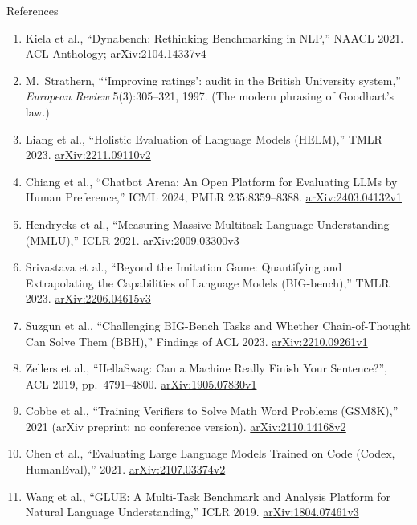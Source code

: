 \begin{frame}[allowframebreaks]{References}
  \footnotesize
  \begin{enumerate}
    \item Kiela et al., ``Dynabench: Rethinking Benchmarking in NLP,'' NAACL 2021. \href{https://aclanthology.org/2021.naacl-main.324/}{ACL Anthology}; \href{https://arxiv.org/abs/2104.14337v4}{arXiv:2104.14337v4}
    \item M.~Strathern, ```Improving ratings': audit in the British University system,'' \textit{European Review} 5(3):305--321, 1997. (The modern phrasing of Goodhart's law.)
    \item Liang et al., ``Holistic Evaluation of Language Models (HELM),'' TMLR 2023. \href{https://arxiv.org/abs/2211.09110v2}{arXiv:2211.09110v2}
    \item Chiang et al., ``Chatbot Arena: An Open Platform for Evaluating LLMs by Human Preference,'' ICML 2024, PMLR 235:8359--8388. \href{https://arxiv.org/abs/2403.04132v1}{arXiv:2403.04132v1}
    \item Hendrycks et al., ``Measuring Massive Multitask Language Understanding (MMLU),'' ICLR 2021. \href{https://arxiv.org/abs/2009.03300v3}{arXiv:2009.03300v3}
    \item Srivastava et al., ``Beyond the Imitation Game: Quantifying and Extrapolating the Capabilities of Language Models (BIG-bench),'' TMLR 2023. \href{https://arxiv.org/abs/2206.04615v3}{arXiv:2206.04615v3}
    \item Suzgun et al., ``Challenging BIG-Bench Tasks and Whether Chain-of-Thought Can Solve Them (BBH),'' Findings of ACL 2023. \href{https://arxiv.org/abs/2210.09261v1}{arXiv:2210.09261v1}
    \item Zellers et al., ``HellaSwag: Can a Machine Really Finish Your Sentence?'', ACL 2019, pp.~4791--4800. \href{https://arxiv.org/abs/1905.07830v1}{arXiv:1905.07830v1}
    \item Cobbe et al., ``Training Verifiers to Solve Math Word Problems (GSM8K),'' 2021 (arXiv preprint; no conference version). \href{https://arxiv.org/abs/2110.14168v2}{arXiv:2110.14168v2}
    \item Chen et al., ``Evaluating Large Language Models Trained on Code (Codex, HumanEval),'' 2021. \href{https://arxiv.org/abs/2107.03374v2}{arXiv:2107.03374v2}
    \item Wang et al., ``GLUE: A Multi-Task Benchmark and Analysis Platform for Natural Language Understanding,'' ICLR 2019. \href{https://arxiv.org/abs/1804.07461v3}{arXiv:1804.07461v3}

\end{enumerate}
\end{frame}
